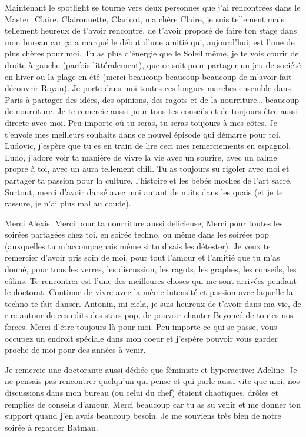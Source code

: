 Maintenant le spotlight se tourne vers deux personnes que j’ai rencontrées dans le Master. Claire, Clairounette, Claricot, ma chère Claire, je suis tellement mais tellement heureux de t’avoir rencontré, de t’avoir proposé de faire ton stage dans mon bureau car ça a marqué le début d’une amitié qui, aujourd’hui, est l’une de plus chères pour moi. Tu as plus d’énergie que le Soleil même, je te vois courir de droite à gauche (parfois littéralement), que ce soit pour partager un jeu de société en hiver ou la plage en été (merci beaucoup beaucoup beaucoup de m’avoir fait découvrir Royan). Je porte dans moi toutes ces longues marches ensemble dans Paris à partager des idées, des opinions, des ragots et de la nourriture… beaucoup de nourriture. Je te remercie aussi pour tous tes conseils et de toujours être aussi directe avec moi. Peu importe où tu seras, tu seras toujours à mes côtes. Je t’envoie mes meilleurs souhaits dans ce nouvel épisode qui démarre pour toi.
Ludovic, j’espère que tu es en train de lire ceci mes remerciements en espagnol. Ludo, j’adore voir ta manière de vivre la vie avec un sourire, avec un calme propre à toi, avec un aura tellement chill. Tu as toujours su rigoler avec moi et partager ta passion pour la culture, l’histoire et les bébés moches de l’art sacré. Surtout, merci d’avoir dansé avec moi autant de nuits dans les quais (et je te rassure, je n’ai plus mal au coude).

Merci Alexis. Merci pour ta nourriture aussi délicieuse, Merci pour toutes les soirées partagées chez toi, en soirée techno, ou même dans les soirées pop (auxquelles tu m’accompagnais même si tu disais les détester). Je veux te remercier d’avoir pris soin de moi, pour tout l’amour et l’amitié que tu m’as donné, pour tous les verres, les discussion, les ragots, les graphes, les conseils, les câlins. Te rencontrer est l’une des meilleures choses qui me sont arrivées pendant le doctorat. Continue de vivre avec la même intensité et passion avec laquelle la techno te fait danser.
Antonin, mi ciela, je suis heureux de t’avoir dans ma vie, de rire autour de ces edits des stars pop, de pouvoir chanter Beyoncé de toutes nos forces. Merci d’être toujours là pour moi.
Peu importe ce qui se passe, vous occupez un endroit spéciale dans mon coeur et j’espère pouvoir vous garder proche de moi pour des années à venir.

Je remercie une doctorante aussi dédiée que féministe et hyperactive: Adeline. Je ne pensais pas rencontrer quelqu’un qui pense et qui parle aussi vite que moi, nos discussions dans mon bureau (ou celui du chef) étaient chaotiques, drôles et remplies de conseils d’amour. Merci beaucoup car tu as su venir et me donner ton support quand j’en avais beaucoup besoin. Je me souviens très bien de notre soirée à regarder Batman.


